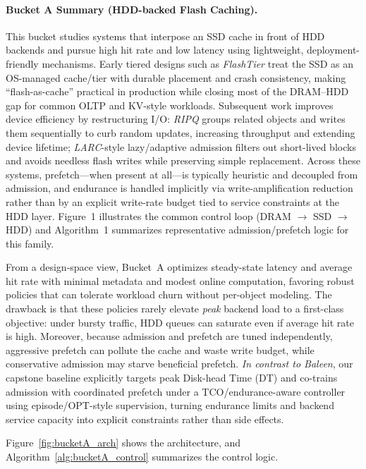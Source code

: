 \paragraph{Bucket A Summary (HDD-backed Flash Caching).}
This bucket studies systems that interpose an SSD cache in front of HDD backends and pursue high hit rate and low latency using lightweight, deployment-friendly mechanisms.
Early tiered designs such as \emph{FlashTier} treat the SSD as an OS-managed cache/tier with durable placement and crash consistency, making ``flash-as-cache'' practical in production while closing most of the DRAM--HDD gap for common OLTP and KV-style workloads.
Subsequent work improves device efficiency by restructuring I/O: \emph{RIPQ} groups related objects and writes them sequentially to curb random updates, increasing throughput and extending device lifetime; \emph{LARC}-style lazy/adaptive admission filters out short-lived blocks and avoids needless flash writes while preserving simple replacement.
Across these systems, prefetch---when present at all---is typically heuristic and decoupled from admission, and endurance is handled implicitly via write-amplification reduction rather than by an explicit write-rate budget tied to service constraints at the HDD layer.
Figure~1 illustrates the common control loop (DRAM $\rightarrow$ SSD $\rightarrow$ HDD) and Algorithm~1 summarizes representative admission/prefetch logic for this family.

From a design-space view, Bucket~A optimizes steady-state latency and average hit rate with minimal metadata and modest online computation, favoring robust policies that can tolerate workload churn without per-object modeling.
The drawback is that these policies rarely elevate \emph{peak} backend load to a first-class objective: under bursty traffic, HDD queues can saturate even if average hit rate is high.
Moreover, because admission and prefetch are tuned independently, aggressive prefetch can pollute the cache and waste write budget, while conservative admission may starve beneficial prefetch.
\emph{In contrast to Baleen}, our capstone baseline explicitly targets peak Disk-head Time (DT) and co-trains admission with coordinated prefetch under a TCO/endurance-aware controller using episode/OPT-style supervision, turning endurance limits and backend service capacity into explicit constraints rather than side effects.


Figure~\ref{fig:bucketA_arch} shows the architecture, and Algorithm~\ref{alg:bucketA_control} summarizes the control logic.


